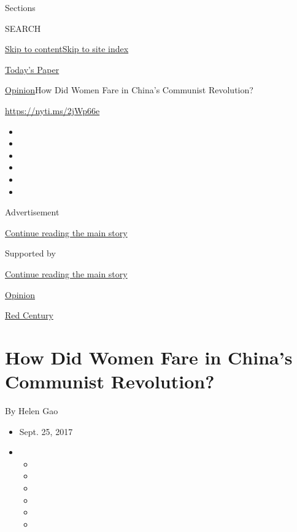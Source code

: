 Sections

SEARCH

\protect\hyperlink{site-content}{Skip to
content}\protect\hyperlink{site-index}{Skip to site index}

\href{https://myaccount.nytimes3xbfgragh.onion/auth/login?response_type=cookie\&client_id=vi}{}

\href{https://www.nytimes3xbfgragh.onion/section/todayspaper}{Today's
Paper}

\href{/section/opinion}{Opinion}\textbar{}How Did Women Fare in China's
Communist Revolution?

\url{https://nyti.ms/2jWp66e}

\begin{itemize}
\item
\item
\item
\item
\item
\item
\end{itemize}

Advertisement

\protect\hyperlink{after-top}{Continue reading the main story}

Supported by

\protect\hyperlink{after-sponsor}{Continue reading the main story}

\href{/section/opinion}{Opinion}

\href{/column/red-century}{Red Century}

\hypertarget{how-did-women-fare-in-chinas-communist-revolution}{%
\section{How Did Women Fare in China's Communist
Revolution?}\label{how-did-women-fare-in-chinas-communist-revolution}}

By Helen Gao

\begin{itemize}
\item
  Sept. 25, 2017
\item
  \begin{itemize}
  \item
  \item
  \item
  \item
  \item
  \item
  \end{itemize}
\end{itemize}

